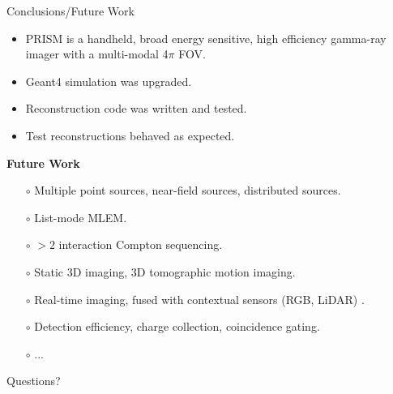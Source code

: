 \documentclass[xcolor=x11names,compress]{beamer}
\renewcommand{\(}{\begin{columns}}
\renewcommand{\)}{\end{columns}}
\newcommand{\<}[1]{\begin{column}{#1}}
\renewcommand{\>}{\end{column}}
\begin{document}
\begin{frame}{Conclusions/Future Work}

\begin{itemize}
\item PRISM is a handheld, broad energy sensitive, high efficiency gamma-ray imager with a multi-modal 4$\pi$ FOV.
\item Geant4 simulation was upgraded. %
\item Reconstruction code was written and tested. %
\item Test reconstructions behaved as expected.  %
\end{itemize}

\vspace{2ex}

\textbf{Future Work}
\begin{itemize}
\small
\item[$\circ$] Multiple point sources, near-field sources, distributed sources.
\item[$\circ$] List-mode MLEM.
\item[$\circ$] $>2$ interaction Compton sequencing.
\item[$\circ$] Static 3D imaging, 3D tomographic motion imaging.
\item[$\circ$] Real-time imaging, fused with contextual sensors (RGB, LiDAR) \cite{Barnowski}.
\item[$\circ$] Detection efficiency, charge collection, coincidence gating.
\item[$\circ$] ...
\end{itemize}

\end{frame}



\begin{frame}[plain,c]

\begin{center}
\Large Questions?
\end{center}


\end{frame}
\end{document}
